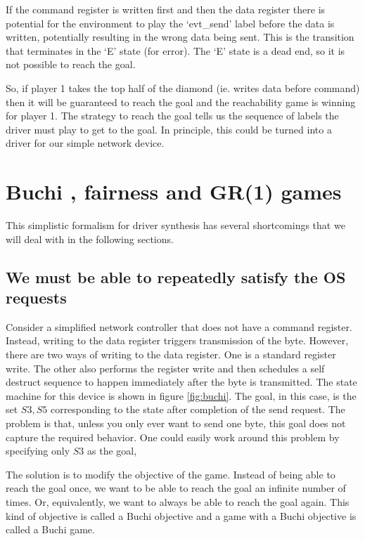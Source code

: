 \documentclass{book}
\newcommand{\buchi}{Buchi }
\theoremstyle{definition}
\begin{document}
If the command register is written first and then the data register there is potential for the environment to play the `evt\_send' label before the data is written, potentially resulting in the wrong data being sent. This is the transition that terminates in the `E' state (for error). The `E' state is a dead end, so it is not possible to reach the goal. 

So, if player 1 takes the top half of the diamond (ie. writes data before command) then it will be guaranteed to reach the goal and the reachability game is winning for player 1. The strategy to reach the goal tells us the sequence of labels the driver must play to get to the goal. In principle, this could be turned into a driver for our simple network device.

\section{\buchi, fairness and GR(1) games}

This simplistic formalism for driver synthesis has several shortcomings that we will deal with in the following sections.

\subsection{We must be able to repeatedly satisfy the OS requests}

Consider a simplified network controller that does not have a command register. Instead, writing to the data register triggers transmission of the byte. However, there are two ways of writing to the data register. One is a standard register write. The other also performs the register write and then schedules a self destruct sequence to happen immediately after the byte is transmitted. The state machine for this device is shown in figure \ref{fig:buchi}. The goal, in this case, is the set ${S3, S5}$ corresponding to the state after completion of the send request. The problem is that, unless you only ever want to send one byte, this goal does not capture the required behavior. One could easily work around this problem by specifying only ${S3}$ as the goal, 

The solution is to modify the objective of the game. Instead of being able to reach the goal once, we want to be able to reach the goal an infinite number of times. Or, equivalently, we want to always be able to reach the goal again. This kind of objective is called a Buchi objective and a game with a Buchi objective is called a Buchi game. 
\end{document}
